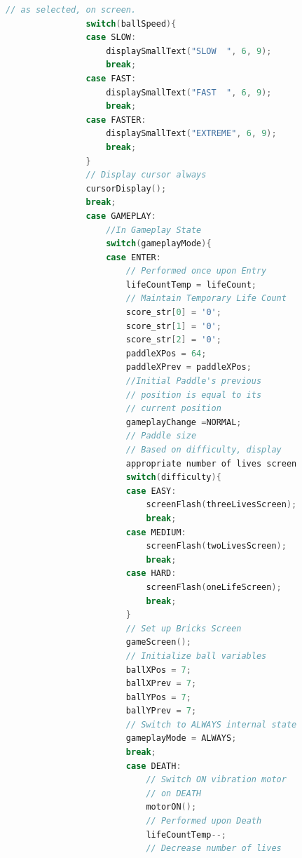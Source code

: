 \documentclass{article}
\begin{document}
\begin{lstlisting}[basicstyle = \small, language = C]
                // as selected, on screen.
                switch(ballSpeed){
                case SLOW:
                    displaySmallText("SLOW  ", 6, 9);
                    break;
                case FAST:
                    displaySmallText("FAST  ", 6, 9);
                    break;
                case FASTER:
                    displaySmallText("EXTREME", 6, 9);
                    break;
                }
                // Display cursor always
                cursorDisplay();
                break;
                case GAMEPLAY:
                    //In Gameplay State
                    switch(gameplayMode){
                    case ENTER:
                        // Performed once upon Entry
                        lifeCountTemp = lifeCount; 
                        // Maintain Temporary Life Count
                        score_str[0] = '0';
                        score_str[1] = '0';
                        score_str[2] = '0';
                        paddleXPos = 64;
                        paddleXPrev = paddleXPos; 
                        //Initial Paddle's previous 
                        // position is equal to its 
                        // current position
                        gameplayChange =NORMAL;
                        // Paddle size
                        // Based on difficulty, display 
                        appropriate number of lives screen
                        switch(difficulty){
                        case EASY:
                            screenFlash(threeLivesScreen);
                            break;
                        case MEDIUM:
                            screenFlash(twoLivesScreen);
                            break;
                        case HARD:
                            screenFlash(oneLifeScreen);
                            break;
                        }
                        // Set up Bricks Screen
                        gameScreen();
                        // Initialize ball variables
                        ballXPos = 7;
                        ballXPrev = 7;
                        ballYPos = 7;
                        ballYPrev = 7;
                        // Switch to ALWAYS internal state
                        gameplayMode = ALWAYS;
                        break;
                        case DEATH:
                            // Switch ON vibration motor 
                            // on DEATH
                            motorON();
                            // Performed upon Death
                            lifeCountTemp--; 
                            // Decrease number of lives

\end{lstlisting}
\end{document}
